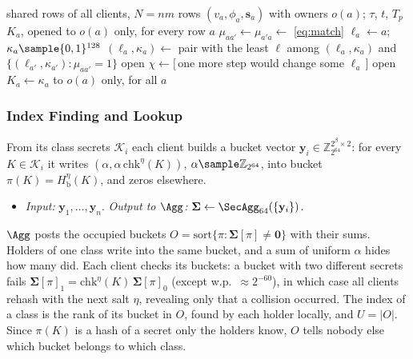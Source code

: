 \begin{algorithm}[t]
\caption{$\Fgrp$: grouping, evaluated by the clients on Shamir shares}
\label{alg:group}
\begin{algorithmic}[1]
\Require shared rows of all clients, $N=nm$ rows $(v_a,\phi_a,\mathbf{s}_a)$ with owners $o(a)$; $\tau$, $t$, $T_p$
\Ensure $K_a$, opened to $o(a)$ only, for every row $a$
  \State $\mu_{aa'}\gets\mu_{a'a}\gets$ \eqref{eq:match} 
\EndFor
{}
  \State $\ell_a\gets a$;\quad $\kappa_a\sample\{0,1\}^{128}$ 
\EndFor
\Repeat
    \State $(\ell_a,\kappa_a)\gets$ pair with the least $\ell$ among $(\ell_a,\kappa_a)$ and $\{(\ell_{a'},\kappa_{a'}):\mu_{aa'}=1\}$
  \EndFor
  \State open $\chi\gets[\,$one more step would change some $\ell_a\,]$
\State open $K_a\gets\kappa_a$ to $o(a)$ only, for all $a$
\end{algorithmic}
\end{algorithm}

\subsubsection{Index Finding and Lookup}
\label{sec:index}
From its class secrets $\mathcal{K}_i$ each client builds a bucket vector
$\mathbf{y}_i\in\mathbb{Z}_{2^{64}}^{2^\beta\times2}$: for every $K\in\mathcal{K}_i$ it writes
$(\alpha,\alpha\,\mathrm{chk}^{\eta}(K))$, $\alpha\sample\mathbb{Z}_{2^{64}}$, into bucket
$\pi(K)=H_{\mathrm b}^{\eta}(K)$, and zeros elsewhere.
\begin{itemize}
  \item \emph{Input:} $\mathbf{y}_1,\dots,\mathbf{y}_n$. \emph{Output to $\Agg$:}
  $\boldsymbol\Sigma\gets\SecAgg_{64}(\{\mathbf{y}_i\})$.
\end{itemize}
$\Agg$ posts the occupied buckets $O=\mathrm{sort}\{\pi:\boldsymbol\Sigma[\pi]\neq\mathbf{0}\}$ with
their sums. Holders of one class write into the same bucket, and a sum of uniform $\alpha$ hides how
many did. Each client checks its buckets: a bucket with two different secrets fails
$\boldsymbol\Sigma[\pi]_1=\mathrm{chk}^{\eta}(K)\,\boldsymbol\Sigma[\pi]_0$ (except w.p.\
${\approx}2^{-60}$), in which case all clients rehash with the next salt $\eta$, revealing only that
a collision occurred. The index of a class is the rank of its bucket in $O$, found by each holder
locally, and $U=|O|$. Since $\pi(K)$ is a hash of a secret only the holders know, $O$ tells
nobody else which bucket belongs to which class.


